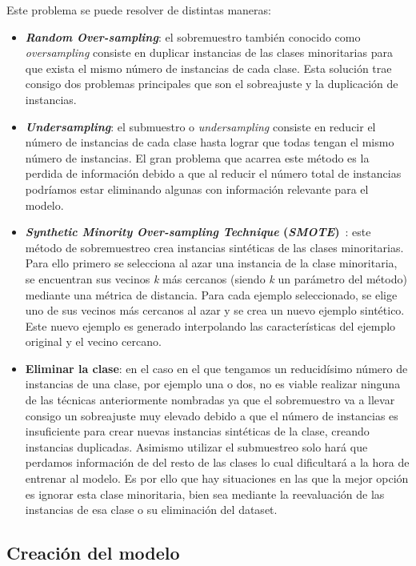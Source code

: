 Este problema se puede resolver de distintas maneras:
\begin{itemize}
\item \textbf{\textit{Random Over-sampling}}: el sobremuestro también conocido como \textit{oversampling} consiste en duplicar instancias de las clases minoritarias para que exista el mismo número de instancias de cada clase. Esta solución trae consigo dos problemas principales que son el sobreajuste y la duplicación de instancias.
\item \textbf{\textit{Undersampling}}: el submuestro o \textit{undersampling} consiste en reducir el número de instancias de cada clase hasta lograr que todas tengan el mismo número de instancias. El gran problema que acarrea este método es la perdida de información debido a que al reducir el número total de instancias podríamos estar eliminando algunas con información relevante para el modelo.
\item \textbf{\textit{Synthetic Minority Over-sampling Technique} (\textit{SMOTE})}~\cite{SMOTE}:
este método de sobremuestreo crea instancias sintéticas de las clases minoritarias. Para ello primero se selecciona al azar una instancia de la clase minoritaria, se encuentran sus vecinos \textit{k} más cercanos (siendo \textit{k} un parámetro del método) mediante una métrica de distancia. Para cada ejemplo seleccionado, se elige uno de sus vecinos más cercanos al azar y se crea un nuevo ejemplo sintético. Este nuevo ejemplo es generado interpolando las características del ejemplo original y el vecino cercano.
\item \textbf{Eliminar la clase}: en el caso en el que tengamos un reducidísimo número de instancias de una clase, por ejemplo una o dos, no es viable realizar ninguna de las técnicas anteriormente nombradas ya que el sobremuestro va a llevar consigo un sobreajuste muy elevado debido a que el número de instancias es insuficiente para crear nuevas instancias sintéticas de la clase, creando instancias duplicadas. Asimismo utilizar el submuestreo solo hará que perdamos información de del resto de las clases lo cual dificultará a la hora de entrenar al modelo. Es por ello que hay situaciones en las que la mejor opción es ignorar esta clase minoritaria, bien sea mediante la reevaluación de las instancias de esa clase o su eliminación del dataset.
\end{itemize}


\subsection{Creación del modelo}

